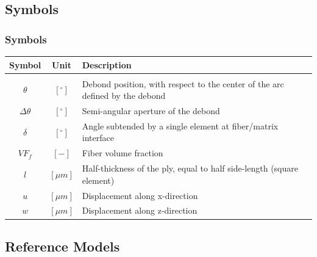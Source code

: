 \documentclass[first,firstsupp,lastsupp,handout,last,hyperref,table]{ETHclass}
\begin{document}
\subsection{Symbols}

\begin{frame}
\frametitle{Symbols}
\vspace{-0.25cm}
\footnotesize
\centering
\captionsetup[figure]{font=scriptsize,labelfont=scriptsize}
\begin{table}[htbp]

  \centering
    \begin{tabularx}{\textwidth}{ccX}
    \textbf{Symbol}&\textbf{Unit} & \textbf{Description} \\[3pt]
    \midrule\\[12pt]
	$\theta$ & $\left[^{\circ}\right]$ & Debond position, with respect to the center of the arc defined by the debond\\[1.5pt]
	$\Delta\theta$ & $\left[^{\circ}\right]$ & Semi-angular aperture of the debond\\[4pt]
	$\delta$ & $\left[^{\circ}\right]$ & Angle subtended by a single element at fiber/matrix interface\\[3pt]
	$VF_{f}$ & $\left[-\right]$ & Fiber volume fraction\\[1.5pt]
	$l$ & $\left[\mu m\right]$ & Half-thickness of the ply, equal to half side-length (square element)\\[3pt]
	$u$ & $\left[\mu m\right]$ & Displacement along x-direction\\[1.5pt]
	$w$ & $\left[\mu m\right]$ & Displacement along z-direction\\
    \end{tabularx}%
  \label{tab:phaseprop}%
\end{table}%
\end{frame}

\subsection{Reference Models}
\end{document}
